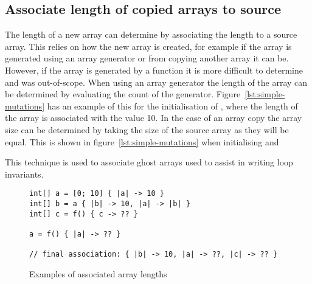 
\subsection{Associate length of copied arrays to source}\label{s:copied-array}

The length of a new array can determine by associating the length to a source
array.
This relies on how the new array is created, for example if the array is
generated using an array generator or from copying another array it can be.
However, if the array is generated by a function it is more difficult to
determine and was out-of-scope.
When using an array generator the length of the array can be determined by
evaluating the count of the generator.
Figure~\ref{lst:simple-mutations} has an example of this for the initialisation
of , where the length of the array is associated with the value 10.
In the case of an array copy the array size can be determined by taking the
size of the source array as they will be equal.
This is shown in figure~\ref{lst:simple-mutations} when initialising 
and 

This technique is used to associate ghost arrays used to assist in writing
loop invariants.

\begin{figure}[ht]
\begin{lstlisting}
int[] a = [0; 10] { |a| -> 10 }
int[] b = a { |b| -> 10, |a| -> |b| }
int[] c = f() { c -> ?? }

a = f() { |a| -> ?? }

// final association: { |b| -> 10, |a| -> ??, |c| -> ?? }
\end{lstlisting}
\caption{Examples of associated array lengths}
\label{lst:assoicated-arrays}
\end{figure}
